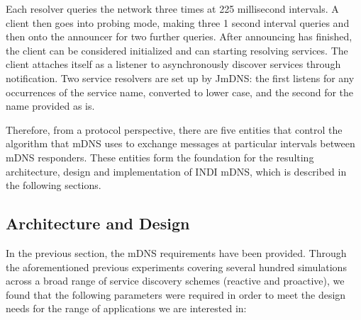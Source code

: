 Each resolver queries the network three times at 225 millisecond intervals.  A client then goes into probing mode, making three 1 second interval queries and then onto the announcer for two further queries.  After announcing has finished, the client can be considered initialized and can starting resolving services.     The client attaches itself as a listener to asynchronously discover services through notification.  Two service resolvers are set up by JmDNS: the first listens for any occurrences of the service name, converted to lower case, and the second for the name provided as is.  

Therefore, from a protocol perspective, there are five entities that control the algorithm that mDNS uses to exchange messages at particular intervals between mDNS responders.  These entities form the foundation for the resulting architecture, design and implementation of INDI mDNS, which is described in the following sections. 


\subsection{Architecture and Design}
\label{sec:architecture-design}

In the previous section, the mDNS requirements have been provided.  Through the aforementioned previous experiments \cite{Macker2010} covering several hundred simulations across a broad range of service discovery schemes (reactive and proactive), we found that the following parameters were required in order to meet the design needs for the range of applications we are interested in:

